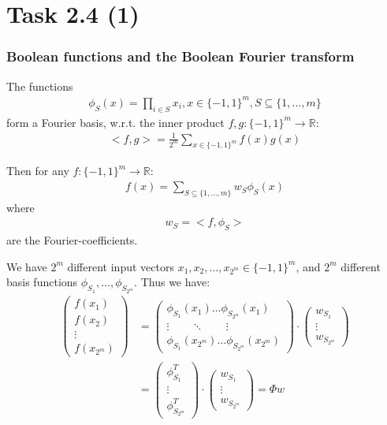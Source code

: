\documentclass{beamer}
\begin{document}
\section{Task 2.4 (1)}
\begin{frame}
	\frametitle{Boolean functions and the Boolean Fourier transform}
	The functions
	\begin{align*}
		\phi_S(x) = \prod_{i\in S} x_i, x\in \{-1,1\}^m, S \subseteq \{1,...,m\}
	\end{align*}
	form a Fourier basis, w.r.t. the inner product $f,g:\{-1,1\}^m \to \mathbb{R}$:
	\begin{align*}
		<f,g> = \frac{1}{2^m}\sum_{x\in\{-1,1\}^m} f(x)g(x)
	\end{align*}
\end{frame}

\begin{frame}
	Then for any $f:\{-1,1\}^m\to \mathbb{R}$:
	\begin{align*}
		f(x) = \sum_{S \subseteq \{1,...,m\}} w_S \phi_S(x)
	\end{align*}
	where
	\begin{align*}
		w_S = <f,\phi_S>
	\end{align*}
	are the Fourier-coefficients.
\end{frame}

\begin{frame}
	We have $2^m$ different input vectors $x_1,x_2,...,x_{2^m} \in \{-1,1\}^m$, and
	$2^m$ different basis functions $\phi_{S_1},...,\phi_{S_{2^m}}$.
	Thus we have:
	\begin{align*}
		\left(\begin{matrix}
		f(x_1)\\
		f(x_2)\\
		\vdots\\
		f(x_{2^m})
		\end{matrix}\right) &= 
		\left(\begin{matrix}
		\phi_{S_1}(x_1) \dots \phi_{S_{2^m}}(x_1)\\
		\vdots\qquad \ddots\qquad \vdots\\
		\phi_{S_1}(x_{2^m}) \dots \phi_{S_{2^m}}(x_{2^m})
		\end{matrix}\right) \cdot
		\left(\begin{matrix}
		w_{S_1}\\
		\vdots\\
		w_{S_{2^m}}
		\end{matrix}\right) \\&=
		\left(\begin{matrix}
		\phi_{S_1}^T\\
		\vdots \\
		\phi_{S_{2^m}}^T
		\end{matrix}\right)\cdot
		\left(\begin{matrix}
		w_{S_1}\\
		\vdots\\
		w_{S_{2^m}}
		\end{matrix}\right)
		 = \Phi w
	\end{align*}	
\end{frame}
\end{document}
